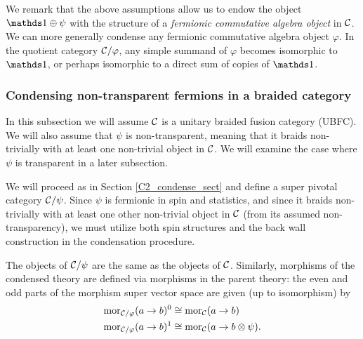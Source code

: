 \medskip

We remark that the above assumptions allow us to endow the object $\unit\oplus\psi$ 
with the structure of a {\it fermionic commutative algebra object} in $\mathcal{C}$.
We can more generally condense any fermionic commutative algebra object $\varphi$.
In the quotient category $\mathcal{C}/\varphi$, any simple summand of $\varphi$ becomes isomorphic to $\unit$,
or perhaps isomorphic to a direct sum of copies of $\unit$.



\subsubsection{Condensing non-transparent fermions in a braided category}  \label{gntf_condense}


In this subsection we will assume $\mathcal{C}$ is a unitary braided fusion category (UBFC).
We will also assume that $\psi$ is non-transparent, meaning that it braids non-trivially with at least one non-trivial object in $\mathcal{C}$. 
We will examine the case where $\psi$ is transparent in a later subsection. 


We will proceed 
as in Section \ref{C2_condense_sect} and define a super pivotal category $\mathcal{C}/\psi$. 
Since $\psi$ is fermionic in spin and statistics, and since it braids non-trivially with 
at least one other non-trivial object in $\mathcal{C}$ (from its assumed non-transparency), we
must utilize both spin structures and the back wall construction in the condensation 
procedure. 

The objects of $\mathcal{C}/\psi$ are the same as the objects of $\mathcal{C}$.
Similarly, morphisms of the condensed theory are defined via morphisms in the parent theory:
the even and odd parts of the morphism super vector space are given (up to isomorphism) by
\begin{align}
\text{mor}_{\mathcal{C}/\varphi}(a \to b)^0 & \cong \text{mor}_{\mathcal{C}}(a \to b) \\
\text{mor}_{\mathcal{C}/\varphi}(a \to b)^1 & \cong \text{mor}_{\mathcal{C}}(a \to b \otimes \psi).
\end{align}

